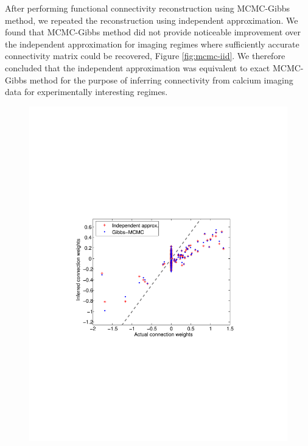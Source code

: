 After performing functional connectivity reconstruction using MCMC-Gibbs method, we repeated the reconstruction using independent approximation. We found that MCMC-Gibbs method did not provide noticeable improvement over the independent approximation for imaging regimes where sufficiently accurate connectivity matrix could be recovered, Figure \ref{fig:mcmc-iid}. We therefore concluded that the independent approximation was equivalent to exact MCMC-Gibbs method for the purpose of inferring connectivity from calcium imaging data for experimentally interesting regimes.


\begin{figure}
\centering
\begin{minipage}[c]{0.45\hsize}
\includegraphics[width=\hsize]{../figs/Figure1_fluor_mcmc_vs_iid}
\end{minipage}
\begin{minipage}[c]{0.45\hsize}

\end{minipage}
\end{figure}
